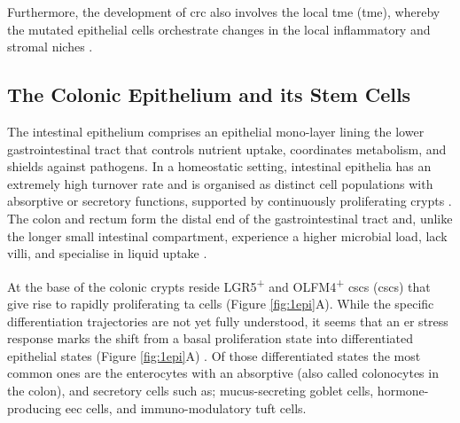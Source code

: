 Furthermore, the development of \acrshort{crc} also involves the local \acrlong{tme} (\acrshort{tme}), whereby the mutated epithelial cells orchestrate changes in the local inflammatory and stromal niches \cite{peddareddigari_tumor_2010}.


\subsection{The Colonic Epithelium and its Stem Cells}



The intestinal epithelium comprises an epithelial mono-layer lining the lower gastrointestinal tract that controls nutrient uptake, coordinates metabolism, and shields against pathogens. In a homeostatic setting, intestinal epithelia has an extremely high turnover rate and is organised as distinct cell populations with absorptive or secretory functions, supported by continuously proliferating crypts \cite{bonis_intestinal_2021}. The colon and rectum form the distal end of the gastrointestinal tract and, unlike the longer small intestinal compartment, experience a higher microbial load, lack villi, and specialise in liquid uptake \cite{kiela_physiology_2016}.

At the base of the colonic crypts reside LGR5\textsuperscript{+} and OLFM4\textsuperscript{+} \acrlong{csc}s (\acrshort{csc}s) that give rise to rapidly proliferating \acrfull{ta} cells (Figure \ref{fig:1epi}A). While the specific differentiation trajectories are not yet fully understood, it seems that an \acrfull{er} stress response marks the shift from a basal proliferation state into differentiated epithelial states (Figure \ref{fig:1epi}A) \cite{heijmans_er_2013, coleman_er_2019}. Of those differentiated states the most common ones are the enterocytes with an absorptive (also called colonocytes in the colon), and secretory cells such as; mucus-secreting goblet cells, hormone-producing \acrfull{eec} cells, and immuno-modulatory tuft cells. 

